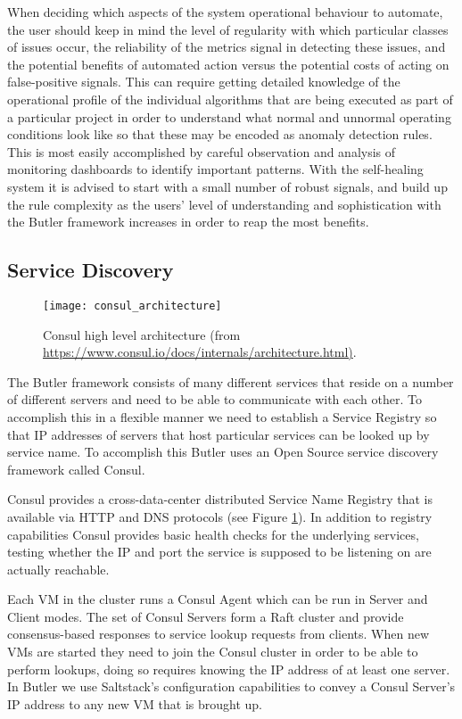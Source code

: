 When deciding which aspects of the system operational behaviour to automate, the user should keep in mind the level of regularity with which particular classes of issues occur, the reliability of the metrics signal in detecting these issues, and the potential benefits of automated action versus the potential costs of acting on false-positive signals. This can require getting detailed knowledge of the operational profile of the individual algorithms that are being executed as part of a particular project in order to understand what normal and unnormal operating conditions look like so that these may be encoded as anomaly detection rules. This is most easily accomplished by careful observation and analysis of monitoring dashboards to identify important patterns. With the self-healing system it is advised to start with a small number of robust signals, and build up the rule complexity as the users' level of understanding and sophistication with the Butler framework increases in order to reap the most benefits.

\subsection{Service Discovery} 
\label{sec:design_consul}

\begin{figure}[h]
  \texttt{[image: consul\_architecture]}
  \centering
  \caption {Consul high level architecture (from \url{https://www.consul.io/docs/internals/architecture.html)}.}
  \label{fig:consul_architecture}
  \end{figure} 

The Butler framework consists of many different services that reside on a number of different servers and need to be able to communicate with each other. To accomplish this in a flexible manner we need to establish a Service Registry so that IP addresses of servers that host particular services can be looked up by service name. To accomplish this Butler uses an Open Source service discovery framework called Consul\autocite{Consul_by_HashiCorp}.

Consul provides a cross-data-center distributed Service Name Registry that is available via HTTP and DNS protocols (see Figure \ref{fig:consul_architecture}). In addition to registry capabilities Consul provides basic health checks for the underlying services, testing whether the IP and port the service is supposed to be listening on are actually reachable.

Each VM in the cluster runs a Consul Agent which can be run in Server and Client modes. The set of Consul Servers form a Raft cluster and provide consensus-based responses to service lookup requests from clients. When new VMs are started they need to join the Consul cluster in order to be able to perform lookups, doing so requires knowing the IP address of at least one server. In Butler we use Saltstack's configuration capabilities to convey a Consul Server's IP address to any new VM that is brought up. 

